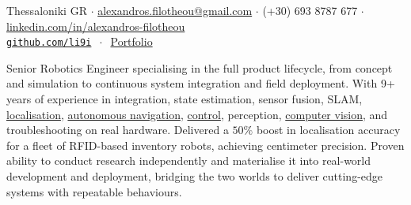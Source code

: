 \documentclass[a4paper,10pt,twoside]{article}
\begin{document}

\par{\bigskip\par}

\begin{center}
\vspace{-0.5em}
  {\small Thessaloniki GR $\cdot$ \href{mailto:alexandros.filotheou@gmail.com}{alexandros.filotheou@gmail.com} $\cdot$ (+30) 693 8787 677 $\cdot$ \href{https://www.linkedin.com/in/alexandros-filotheou-5b6a8676/}{linkedin.com/in/alexandros-filotheou} \\
  \href{https://github.com/li9i/}{\texttt{github.com/li9i}} $\ \cdot\ $ \href{https://mozilla.github.io/pdf.js/web/viewer.html?file=https://raw.githubusercontent.com/li9i/portfolio/master/portfolio.pdf}{Portfolio}}
\end{center}\vspace{2em}

\vspace{-3em}
\begin{bw_box} \small
Senior Robotics Engineer specialising in the full product lifecycle, from concept and simulation to continuous system integration and field deployment. With 9+ years of experience in integration, state estimation, sensor fusion, SLAM, \href{https://github.com/li9i/fsm-lo}{localisation}, \href{https://link.springer.com/article/10.1007/s10846-019-01086-y}{autonomous navigation}, \href{https://www.tandfonline.com/doi/full/10.1080/00207179.2018.1514129}{control}, perception, \href{https://github.com/li9i/pandora\_vision\_2014}{computer vision}, and troubleshooting on real hardware. Delivered a $50\%$ boost in localisation accuracy for a fleet of RFID-based inventory robots, achieving centimeter precision. Proven ability to conduct research independently and materialise it into real-world development and deployment, bridging the two worlds to deliver cutting-edge systems with repeatable behaviours.
\end{bw_box}

\end{document}
